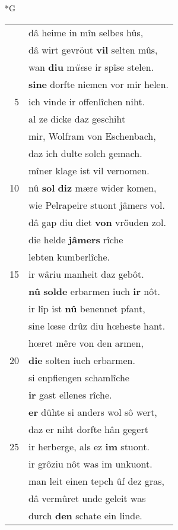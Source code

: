 \documentclass[8pt,a4paper,notitlepage]{article}
\begin{document}
\newpage
\begin{table}[ht]
\begin{minipage}[t]{0.5\linewidth}
\small
\begin{center}*G
\end{center}
\begin{tabular}{rl}
 & dâ heime in mîn selbes hûs,\\ 
 & dâ wirt gevröut \textbf{vil} selten mûs,\\ 
 & wan \textbf{diu} m\textit{üe}se ir spîse stelen.\\ 
 & \textbf{si}\textbf{ne} dorfte niemen vor mir helen.\\ 
5 & ich vinde ir offenlîchen niht.\\ 
 & al ze dicke daz geschiht\\ 
 & mir, Wolfram von Eschenbach,\\ 
 & daz ich dulte solch gemach.\\ 
 & mîner klage ist vil vernomen.\\ 
10 & nû \textbf{sol} \textbf{diz} mære wider komen,\\ 
 & wie Pelrapeire stuont jâmers vol.\\ 
 & dâ gap diu diet \textbf{von} vröuden zol.\\ 
 & die helde \textbf{jâmers} rîche\\ 
 & lebten kumberlîche.\\ 
15 & ir wâriu manheit daz gebôt.\\ 
 & \textbf{nû} \textbf{solde} erbarmen iuch \textbf{ir} nôt.\\ 
 & ir lîp ist \textbf{nû} benennet pfant,\\ 
 & sine lœse drûz diu hœheste hant.\\ 
 & hœret mêre von den armen,\\ 
20 & \textbf{die} solten iuch erbarmen.\\ 
 & si enpfiengen schamlîche\\ 
 & \textbf{ir} gast ellenes rîche.\\ 
 & \textbf{er} dûhte si anders wol sô wert,\\ 
 & daz er niht dorfte hân gegert\\ 
25 & ir herberge, als ez \textbf{im} stuont.\\ 
 & ir grôziu nôt was im unkuont.\\ 
 & man leit einen tepch ûf dez gras,\\ 
 & dâ vermûret unde geleit was\\ 
 & durch \textbf{den} schate ein linde.\\ 

\end{tabular}
\end{minipage}
\end{table}
\end{document}
